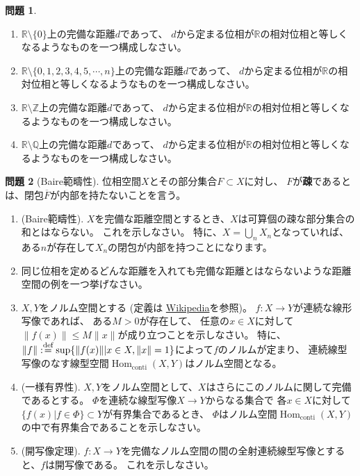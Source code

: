 \documentclass[uplatex]{jsarticle}
\theoremstyle{definition}
\newtheorem{prob}[prob]{問題}
\DeclareMathOperator{\Hom}{Hom}
\newcommand{\dfn}{:\overset{\mbox{{\scriptsize def}}}{=}}
\newcommand{\R}{\mathbb{R}}
\newcommand{\Q}{\mathbb{Q}}
\newcommand{\Z}{\mathbb{Z}}
\begin{document}
\begin{prob}
  \
  \begin{enumerate}
    \item
    \(\R\setminus \{0\}\)上の完備な距離\(d\)であって、
    \(d\)から定まる位相が\(\R\)の相対位相と等しくなるようなものを一つ構成しなさい。
    \item
    \(\R\setminus \{0,1,2,3,4,5,\cdots,n\}\)上の完備な距離\(d\)であって、
    \(d\)から定まる位相が\(\R\)の相対位相と等しくなるようなものを一つ構成しなさい。
    \item
    \(\R\setminus \Z\)上の完備な距離\(d\)であって、
    \(d\)から定まる位相が\(\R\)の相対位相と等しくなるようなものを一つ構成しなさい。
    \item
    \(\R\setminus \Q\)上の完備な距離\(d\)であって、
    \(d\)から定まる位相が\(\R\)の相対位相と等しくなるようなものを一つ構成しなさい。
  \end{enumerate}
\end{prob}




\begin{prob}[Baire範疇性]
  位相空間\(X\)とその部分集合\(F\subset X\)に対し、
  \(F\)が\textbf{疎}であるとは、閉包\(\overline{F}\)が内部を持たないことを言う。
  \begin{enumerate}
    \item (Baire範疇性).
    \(X\)を完備な距離空間とするとき、\(X\)は可算個の疎な部分集合の和とはならない。
    これを示しなさい。
    特に、\(X = \bigcup_n X_n\)となっていれば、
    ある\(n\)が存在して\(X_n\)の閉包が内部を持つことになります。
    \item
    同じ位相を定めるどんな距離を入れても完備な距離とはならないような距離空間の例を一つ挙げなさい。
    \item
    \(X,Y\)をノルム空間とする (定義は
    \href{https://ja.wikipedia.org/wiki/%E3%83%8E%E3%83%AB%E3%83%A0%E7%B7%9A%E5%9E%8B%E7%A9%BA%E9%96%93}{Wikipedia}を参照)。
    \(f:X\to Y\)が連続な線形写像であれば、
    ある\(M>0\)が存在して、
    任意の\(x\in X\)に対して\(\|f(x)\| \leq M\|x\|\)が成り立つことを示しなさい。
    特に、\(\|f\|\dfn \sup\{\|f(x)\| | x\in X, \|x\|=1\}\)によって\(f\)のノルムが定まり、
    連続線型写像のなす線型空間\(\Hom_{\mathrm{conti}}(X,Y)\)はノルム空間となる。
    \item (一様有界性).
    \(X,Y\)をノルム空間として、\(X\)はさらにこのノルムに関して完備であるとする。
    \(\Phi\)を連続な線型写像\(X\to Y\)からなる集合で
    各\(x\in X\)に対して\(\{f(x)|f\in \Phi\}\subset Y\)が有界集合であるとき、
    \(\Phi\)はノルム空間\(\Hom_{\mathrm{conti}}(X,Y)\)の中で有界集合であることを示しなさい。
    \item (開写像定理).
    \(f:X\to Y\)を完備なノルム空間の間の全射連続線型写像とすると、\(f\)は開写像である。
    これを示しなさい。
  \end{enumerate}
\end{prob}
\end{document}

